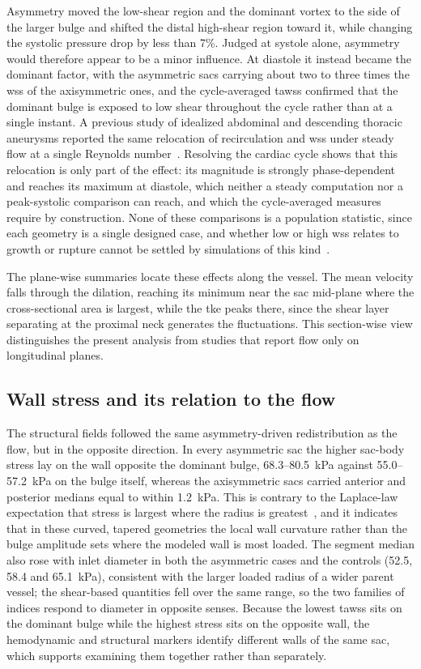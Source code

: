 \documentclass[12pt,a4paper]{article}
\newcommand{\WSS}{\ac{wss}\xspace}
\newcommand{\TAWSS}{\ac{tawss}\xspace}
\newcommand{\TKE}{\ac{tke}\xspace}
\theoremstyle{definition}
\numberwithin{equation}{section}
\begin{document}
Asymmetry moved the low-shear region and the dominant vortex to the side of the larger bulge and shifted the distal high-shear region toward it, while changing the systolic pressure drop by less than 7\%. Judged at systole alone, asymmetry would therefore appear to be a minor influence. At diastole it instead became the dominant factor, with the asymmetric sacs carrying about two to three times the \WSS of the axisymmetric ones, and the cycle-averaged \TAWSS confirmed that the dominant bulge is exposed to low shear throughout the cycle rather than at a single instant. A previous study of idealized abdominal and descending thoracic aneurysms reported the same relocation of recirculation and \WSS under steady flow at a single Reynolds number~\cite{rehman2024comparative}. Resolving the cardiac cycle shows that this relocation is only part of the effect: its magnitude is strongly phase-dependent and reaches its maximum at diastole, which neither a steady computation nor a peak-systolic comparison can reach, and which the cycle-averaged measures require by construction. None of these comparisons is a population statistic, since each geometry is a single designed case, and whether low or high \WSS relates to growth or rupture cannot be settled by simulations of this kind~\cite{geers2017wall,lipp2020computational}.

The plane-wise summaries locate these effects along the vessel. The mean velocity falls through the dilation, reaching its minimum near the sac mid-plane where the cross-sectional area is largest, while the \TKE peaks there, since the shear layer separating at the proximal neck generates the fluctuations. This section-wise view distinguishes the present analysis from studies that report flow only on longitudinal planes.

\subsection{Wall stress and its relation to the flow}
The structural fields followed the same asymmetry-driven redistribution as the flow, but in the opposite direction. In every asymmetric sac the higher sac-body stress lay on the wall opposite the dominant bulge, 68.3--80.5~kPa against 55.0--57.2~kPa on the bulge itself, whereas the axisymmetric sacs carried anterior and posterior medians equal to within 1.2~kPa. This is contrary to the Laplace-law expectation that stress is largest where the radius is greatest~\cite{dobrin1989pathophysiology}, and it indicates that in these curved, tapered geometries the local wall curvature rather than the bulge amplitude sets where the modeled wall is most loaded. The segment median also rose with inlet diameter in both the asymmetric cases and the controls (52.5, 58.4 and 65.1~kPa), consistent with the larger loaded radius of a wider parent vessel; the shear-based quantities fell over the same range, so the two families of indices respond to diameter in opposite senses. Because the lowest \TAWSS sits on the dominant bulge while the highest stress sits on the opposite wall, the hemodynamic and structural markers identify different walls of the same sac, which supports examining them together rather than separately. 
\end{document}
